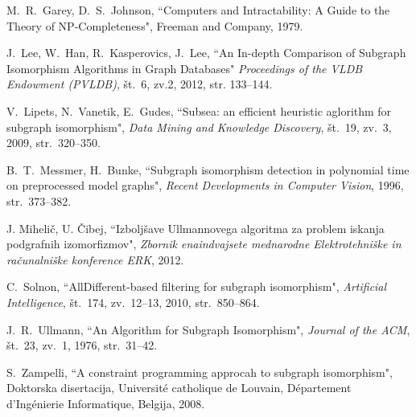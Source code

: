 \documentclass[a4paper, 12pt, ]{book}
\begin{document}
\begin{thebibliography}{99}
	 M.~R.~Garey, D.~S.~Johnson, ``Computers and Intractability: A Guide to the Theory of NP-Completeness",
		Freeman and Company, 1979.
	
	J.~Lee, W.~Han, R.~Kasperovics, J.~Lee, ``An In-depth Comparison of Subgraph Isomorphism Algorithms in Graph Databases"
		\textit{Proceedings of the VLDB Endowment (PVLDB)}, št.~6, zv.2, 2012, str. 133--144.
	
	 V.~Lipets, N.~Vanetik, E.~Gudes, ``Subsea: an efficient heuristic aglorithm for subgraph isomorphism",
		\textit{Data Mining and Knowledge Discovery}, št.~19, zv.~3, 2009, str.~320--350.

	 B.~T.~Messmer, H.~Bunke, ``Subgraph isomorphism detection in polynomial time on preprocessed model graphs",
		\textit{Recent Developments in Computer Vision}, 1996, str.~373--382.

	 J. Mihelič, U. Čibej, ``Izboljšave Ullmannovega algoritma za problem iskanja podgrafnih izomorfizmov",
		\textit{Zbornik enaindvajsete mednarodne Elektrotehniške in računalniške konference ERK}, 2012.

	 C.~Solnon, ``AllDifferent-based filtering for subgraph isomorphism",
		\textit{Artificial Intelligence}, št.~174, zv.~12--13, 2010, str.~850--864.

	 J.~R.~Ullmann, ``An Algorithm for Subgraph Isomorphism",
		\textit{Journal of the ACM}, št.~23, zv.~1, 1976, str.~31--42.

	 S.~Zampelli, ``A constraint programming approcah to subgraph isomorphism", Doktorska disertacija, 
	Universit\'{e} catholique de Louvain, D\'{e}partement d’Ing\'{e}nierie Informatique, Belgija, 2008.
	

\end{thebibliography}
\end{document}
